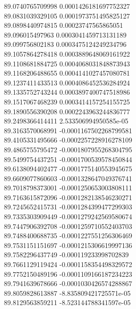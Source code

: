 {89.0740765709998 0.0001426181697752327
 \\
89.0831039329105 0.0001973751495825127
 \\
89.0898440974815 0.00023747565865051
 \\
89.096015497963 0.0003041459713131189
 \\
89.099756802183 0.0003475124249234796
 \\
89.1057864278418 0.0003889648069161922
 \\
89.1108681884725 0.0004068031848873943
 \\
89.1168206488655 0.0004141027457080781
 \\
89.1237411433513 0.0004086452536284924
 \\
89.1335752743244 0.0003897400747518986
 \\
89.1517067468239 0.0003414157254155725
 \\
89.1890556390208 0.0002243963244836777
 \\
89.2498366414411 2.533506994950585e-05
 \\
89.3163570068991 -0.0001167502268799581
 \\
89.4105331495666 -0.0002257228916278109
 \\
89.4865755795472 -0.0001807955268304795
 \\
89.5499754437251 -0.0001700539578450844
 \\
89.6138094402477 -0.0001775140553945675
 \\
89.6609077860603 -0.0001328647049376741
 \\
89.7018798373001 -0.0001250653003808111
 \\
89.7163615872096 -0.0001282138546230271
 \\
89.7245652415731 -0.0001284399477299303
 \\
89.7335303909449 -0.0001279242569580674
 \\
89.7447906392708 -0.0001259710552403703
 \\
89.7488400688735 -0.0001227551256306469
 \\
89.7531151151697 -0.0001215306619997136
 \\
89.7582296437749 -0.000119233998702839
 \\
89.7661129119424 -0.0001158354498329572
 \\
89.7752150489196 -0.0001109166187234223
 \\
89.7941639678666 -0.0001030426574288867
 \\
89.8059828613887 -8.835809421725571e-05
 \\
89.8129563859211 -8.523144788341597e-05
}
